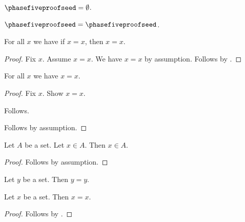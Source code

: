

\begin{definition}\label{phase5_proof_seed}
    $\phasefiveproofseed = \emptyset$.
\end{definition}

\begin{proposition}\label{phase5_implicit_proof}
    $\phasefiveproofseed = \phasefiveproofseed$.
\end{proposition}

\begin{proposition}\label{phase5_structural_proof}
    For all $x$ we have if $x = x$, then $x = x$.
\end{proposition}
\begin{proof}
    Fix $x$.
    Assume $x = x$.
    We have $x = x$ by assumption.
    Follows by .
\end{proof}

\begin{proposition}\label{phase5_subclaim_proof}
    For all $x$ we have $x = x$.
\end{proposition}
\begin{proof}
    Fix $x$.
    Show $x = x$.
    \begin{subproof}
        Follows.
    \end{subproof}
    Follows by assumption.
\end{proof}

\begin{proposition}\label{phase5_header_proof}
    Let $A$ be a set.
    Let $x \in A$.
    Then $x \in A$.
\end{proposition}
\begin{proof}
    Follows by assumption.
\end{proof}

\begin{proposition}\label{phase5_generalized_auto}
    Let $y$ be a set.
    Then $y = y$.
\end{proposition}

\begin{proposition}\label{phase5_local_auto}
    Let $x$ be a set.
    Then $x = x$.
\end{proposition}
\begin{proof}
    Follows by \auto.
\end{proof}
